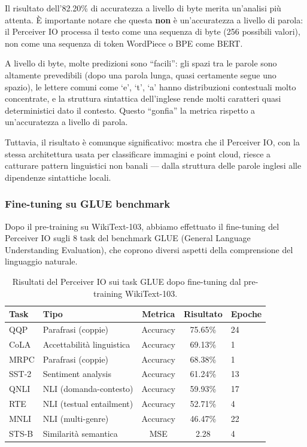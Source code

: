 \documentclass[12pt,a4paper]{article}
\begin{document}
Il risultato dell'82.20\% di accuratezza a livello di byte merita un'analisi pi\`u attenta. \`E importante notare che questa \textbf{non} \`e un'accuratezza a livello di parola: il Perceiver IO processa il testo come una sequenza di byte (256 possibili valori), non come una sequenza di token WordPiece o BPE come BERT.

A livello di byte, molte predizioni sono ``facili'': gli spazi tra le parole sono altamente prevedibili (dopo una parola lunga, quasi certamente segue uno spazio), le lettere comuni come `e', `t', `a' hanno distribuzioni contestuali molto concentrate, e la struttura sintattica dell'inglese rende molti caratteri quasi deterministici dato il contesto. Questo ``gonfia'' la metrica rispetto a un'accuratezza a livello di parola.

Tuttavia, il risultato \`e comunque significativo: mostra che il Perceiver IO, con la stessa architettura usata per classificare immagini e point cloud, riesce a catturare pattern linguistici non banali --- dalla struttura delle parole inglesi alle dipendenze sintattiche locali.

\subsubsection{Fine-tuning su GLUE benchmark}

Dopo il pre-training su WikiText-103, abbiamo effettuato il fine-tuning del Perceiver IO sugli 8 task del benchmark GLUE (General Language Understanding Evaluation), che coprono diversi aspetti della comprensione del linguaggio naturale.

\begin{table}[htbp]
\centering
\caption{Risultati del Perceiver IO sui task GLUE dopo fine-tuning dal pre-training WikiText-103.}
\label{tab:glue_risultati}
\begin{tabular}{@{}llccl@{}}
\toprule
\textbf{Task} & \textbf{Tipo} & \textbf{Metrica} & \textbf{Risultato} & \textbf{Epoche} \\
\midrule
QQP & Parafrasi (coppie) & Accuracy & 75.65\% & 24 \\
CoLA & Accettabilit\`a linguistica & Accuracy & 69.13\% & 1 \\
MRPC & Parafrasi (coppie) & Accuracy & 68.38\% & 1 \\
SST-2 & Sentiment analysis & Accuracy & 61.24\% & 13 \\
QNLI & NLI (domanda-contesto) & Accuracy & 59.93\% & 17 \\
RTE & NLI (testual entailment) & Accuracy & 52.71\% & 4 \\
MNLI & NLI (multi-genre) & Accuracy & 46.47\% & 22 \\
STS-B & Similarit\`a semantica & MSE & 2.28 & 4 \\
\bottomrule
\end{tabular}
\end{table}
\end{document}
